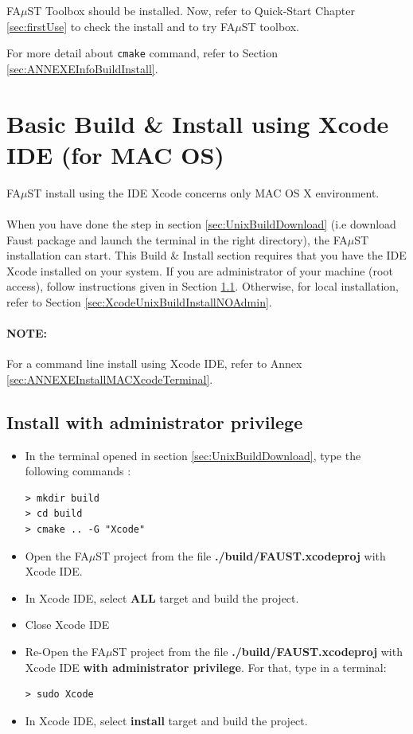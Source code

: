 FA$\mu$ST Toolbox should be installed. Now, refer to Quick-Start Chapter \ref{sec:firstUse} to check the install and to try FA$\mu$ST toolbox.

For more detail about \texttt{cmake} command, refer to Section \ref{sec:ANNEXEInfoBuildInstall}.


\section{Basic Build \& Install using Xcode IDE (for MAC OS)}\label{sec:MacInstallXcode}

FA$\mu$ST install using the IDE Xcode concerns only MAC OS X environment.
\paragraph{}When you have done the step in section  \ref{sec:UnixBuildDownload} (i.e download Faust package and launch the terminal in the right directory),  the FA$\mu$ST installation can start. This Build \& Install section requires that you have the IDE Xcode installed on your system. If you are administrator of your machine (root access), follow instructions given in Section \ref{sec:XcodeUnixBuildInstallAdmin}. Otherwise, for local installation, refer to Section \ref{sec:XcodeUnixBuildInstallNOAdmin}. 

\paragraph{NOTE: }For a command line install using Xcode IDE, refer to Annex \ref{sec:ANNEXEInstallMACXcodeTerminal}.  

\subsection{Install with administrator privilege}\label{sec:XcodeUnixBuildInstallAdmin}
 
\begin{itemize}
\item In the terminal opened in section 
\ref{sec:UnixBuildDownload}, type the following commands : 
\lstset{style=customBash}
\begin{lstlisting}
> mkdir build
> cd build
> cmake .. -G "Xcode"
\end{lstlisting}

\item Open the FA$\mu$ST project from the file \textbf{./build/FAUST.xcodeproj} with Xcode IDE. 
\item In Xcode IDE, select \textbf{ALL} target and build the project. 
\item Close Xcode IDE
\item Re-Open the FA$\mu$ST project from the file \textbf{./build/FAUST.xcodeproj} with Xcode IDE \textbf{with administrator privilege}. For that, type in a terminal:
\lstset{style=customBash}
\begin{lstlisting}
> sudo Xcode
\end{lstlisting}
\item In Xcode IDE, select \textbf{install} target and build the project. 
\end{itemize}

